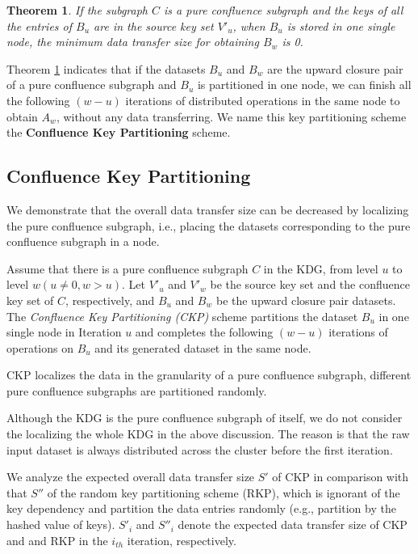 \documentclass[10pt,journal,compsoc]{IEEEtran}
\begin{document}
\newtheorem{conduction}{\textbf{Theorem}}[theorem] 
\begin{conduction}\label{thm:zeroTransfer}
If the subgraph $C$ is a pure confluence subgraph and the keys of all the entries of $B_u$ are in the source key set $V'_u$, 
when $B_u$ is stored in one single node, 
the minimum data transfer size for obtaining $B_w$ is 0. 
\end{conduction}

Theorem \ref{thm:zeroTransfer} indicates that if the datasets $B_u$ and $B_w$ are 
the upward closure pair of a pure confluence subgraph 
and $B_u$ is partitioned in one node, 
we can finish all the following $(w-u)$ iterations of distributed operations in the same node to obtain $A_w$, 
without any data transferring. 
We name this key partitioning scheme the \textbf{Confluence Key Partitioning} scheme. 


\subsection{Confluence Key Partitioning}\label{section:CKP}
We demonstrate that the overall data transfer size can be decreased by 
localizing the pure confluence subgraph, 
i.e., placing the datasets corresponding to the pure confluence subgraph in a node. 

Assume that there is a pure confluence subgraph $C$ in the KDG, 
from level $u$ to level $w(u \neq 0, w>u)$. 
Let $V'_u$ and $V'_w$ be the source key set and the confluence key set of $C$, respectively, and $B_u$ and $B_w$ be the upward closure pair datasets. 
The \emph{Confluence Key Partitioning (CKP)} scheme partitions the dataset $B_u$ %
in one single node in Iteration $u$
and completes the following $(w-u)$ iterations of operations on $B_u$ and its generated dataset in the same node. 

CKP localizes the data in the granularity of a pure confluence subgraph, different pure confluence subgraphs are partitioned randomly. 

Although the KDG is the pure confluence subgraph of itself,
we do not consider the localizing the whole KDG in the above discussion. 
The reason is that the raw input dataset %
is always distributed across the cluster before the first iteration. 

We analyze the expected overall data transfer size $S'$ of CKP
in comparison with that $S''$ of the random key partitioning scheme (RKP), which is ignorant of the key dependency and partition the data entries randomly (e.g., partition by the hashed value of keys). 
$S'_i$ and $S''_i$ denote the expected data transfer size of CKP and and RKP in the $i_{th}$ iteration, respectively.  
\end{document}
